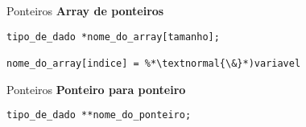 \documentclass[10pt]{beamer}
\begin{document}
\begin{frame}[fragile]{Ponteiros}
  \huge
  \textbf{Array de ponteiros}
  \vfill
  \Large
  \begin{lstlisting}
tipo_de_dado *nome_do_array[tamanho];

nome_do_array[indice] = %*\textnormal{\&}*)variavel
  \end{lstlisting}
\end{frame}

\begin{frame}[fragile]{Ponteiros}
  \huge
  \textbf{Ponteiro para ponteiro}
  \vfill
  \Large
  \begin{verbatim}
tipo_de_dado **nome_do_ponteiro;
  \end{verbatim}
\end{frame}
\end{document}
